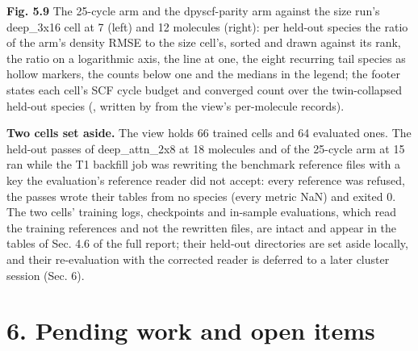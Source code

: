 \documentclass[10pt,a4paper]{article}
\begin{document}
\textbf{Fig. 5.9} The 25-cycle arm and the dpyscf-parity arm against the size run's deep\_3x16 cell at 7 (left) and 12 molecules (right): per held-out species the ratio of the arm's density RMSE to the size cell's, sorted and drawn against its rank, the ratio on a logarithmic axis, the line at one, the eight recurring tail species as hollow markers, the counts below one and the medians in the legend; the footer states each cell's SCF cycle budget and converged count over the twin-collapsed held-out species (, written by  from the view's per-molecule records).

\textbf{Two cells set aside.} The view holds 66 trained cells and 64 evaluated ones. The held-out passes of deep\_attn\_2x8 at 18 molecules and of the 25-cycle arm at 15 ran while the T1 backfill job was rewriting the benchmark reference files with a key the evaluation's reference reader did not accept: every reference was refused, the passes wrote their tables from no species (every metric NaN) and exited 0. The two cells' training logs, checkpoints and in-sample evaluations, which read the training references and not the rewritten files, are intact and appear in the tables of Sec. 4.6 of the full report; their held-out directories are set aside locally, and their re-evaluation with the corrected reader is deferred to a later cluster session (Sec. 6).

\section*{6. Pending work and open items}
\end{document}
